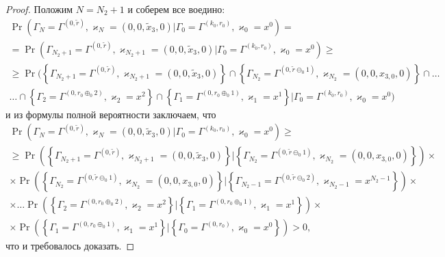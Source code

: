 \documentclass[a4paper,12pt,russian]{extarticle}
\begin{document}
\begin{proof}
Положим $N = N_2+1$ и соберем все воедино:
\begin{multline*}
\Pr(\Gamma_{N}=\Gamma^{(0,\tilde{r} )}, \varkappa_{N}=(0,0,\tilde{x}_3,0)|
\Gamma_{0}=\Gamma^{(k_0,r_0)}, \varkappa_{0}=x^0) = \\ =
\Pr(\Gamma_{ N_2+1}=\Gamma^{(0,\tilde{r} )}, \varkappa_{ N_2+1}=(0,0,\tilde{x}_3,0)|
\Gamma_{0}=\Gamma^{(k_0,r_0)}, \varkappa_{0}=x^0) \geqslant \\ 
\geqslant
\Pr(\left\{\Gamma_{ N_2+1}=\Gamma^{(0,\tilde{r} )}, \varkappa_{ N_2+1}=(0,0,\tilde{x}_3,0)\right\} \cap \left\{ \Gamma_{ N_2}=\Gamma^{(0,\tilde{r} \ominus_0 1 )}, \varkappa_{N_2}=(0,0,x_{3,0},0)\right\} \cap\ldots \\
\ldots \cap \left\{\Gamma_{2}=\Gamma^{(0,r_0\oplus_{0}2)},\varkappa_{2}=x^2\right\} \cap \left\{ \Gamma_{1}=\Gamma^{(0,r_0\oplus_{0}1)},\varkappa_{1}=x^1\right\} |
\Gamma_{0}=\Gamma^{(k_0,r_0)}, \varkappa_{0}=x^0)
\end{multline*}
и из формулы полной вероятности заключаем, что 
\begin{multline*}
\Pr(\Gamma_{N}=\Gamma^{(0,\tilde{r} )}, \varkappa_{N}=(0,0,\tilde{x}_3,0)|
\Gamma_{0}=\Gamma^{(k_0,r_0)}, \varkappa_{0}=x^0) \geqslant \\ 
\geqslant
\Pr(\left\{\Gamma_{ N_2+1}=\Gamma^{(0,\tilde{r} )}, \varkappa_{ N_2+1}=(0,0,\tilde{x}_3,0)\right\} | \left\{ \Gamma_{ N_2}=\Gamma^{(0,\tilde{r} \ominus_0 1 )}, \varkappa_{N_2}=(0,0,x_{3,0},0)\right\}) \times 
\\ \times
\Pr(\left\{\Gamma_{ N_2}=\Gamma^{(0,\tilde{r} \ominus_0 1 )}, \varkappa_{ N_2}=(0,0,x_{3,0},0)\right\} | \left\{ \Gamma_{ N_2-1}=\Gamma^{(0,\tilde{r} \ominus_0 2 )}, \varkappa_{N_2-1}=x^{N_2-1}\right\}) \times \\
\times \ldots 
\Pr(\left\{\Gamma_{2}=\Gamma^{(0,r_0\oplus_{0}2)},\varkappa_{2}=x^2\right\} | \left\{ \Gamma_{1}=\Gamma^{(0,r_0\oplus_{0}1)},\varkappa_{1}=x^1\right\}) \times \\
\times
\Pr(\left\{\Gamma_{1}=\Gamma^{(0,r_0\oplus_{0}1)},\varkappa_{1}=x^1\right\} | \left\{ \Gamma_{0}=\Gamma^{(0,r_0)},\varkappa_{0}=x^0\right\})>0,
\end{multline*}
что и требовалось доказать.
\end{proof}
\end{document}
